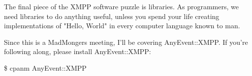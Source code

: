 The final piece of the XMPP software puzzle is libraries.  As programmers, we need
libraries to do anything useful, unless you spend your life creating implementations of
"Hello, World" in every computer language known to man.

\pause
Since this is a MadMongers meeting, I'll be covering AnyEvent::XMPP.  If you're following along,
please install AnyEvent::XMPP:

\begin{shaded}
\$ cpanm AnyEvent::XMPP
\end{shaded}
